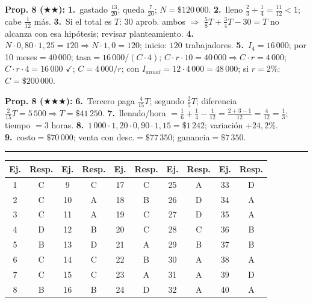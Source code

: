 \documentclass[11pt, letterpaper]{article}
\newcommand{\subbloque}[1]{%
  \vspace{14pt}
  \noindent{\large\bfseries\color{zenitnavy} #1}\par
  \vspace{4pt}\hrule height 1pt\vspace{8pt}}
\begin{document}
\textbf{Prop. 8 ($\bigstar\bigstar$):} \textbf{1.}~gastado $\tfrac{13}{20}$; queda $\tfrac{7}{20}$; $N=\$120\,000$. \quad \textbf{2.}~lleno $\tfrac{2}{3}+\tfrac{1}{4}=\tfrac{11}{12}<1$; cabe $\tfrac{1}{12}$ m\'as. \quad \textbf{3.}~Si el total es $T$: $30$ aprob. ambos $\Rightarrow$ $\tfrac{5}{8}T+\tfrac{3}{4}T-30=T$ no alcanza con esa hip\'otesis; revisar planteamiento. \quad \textbf{4.}~$N\cdot0{,}80\cdot1{,}25=120\Rightarrow N\cdot1{,}0=120$; inicio: $120$ trabajadores. \quad \textbf{5.}~$I_4=16\,000$; por 10 meses$=40\,000$; tasa$=16\,000/(C\cdot4)$; $C\cdot r\cdot10=40\,000\Rightarrow C\cdot r=4\,000$; $C\cdot r\cdot4=16\,000$ $\checkmark$; $C=4\,000/r$; con $I_{anual}=12\cdot4\,000=48\,000$; si $r=2\%$: $C=\$200\,000$.

\textbf{Prop. 8 ($\bigstar\bigstar\bigstar$):} \textbf{6.}~Tercero paga $\tfrac{4}{15}T$; segundo $\tfrac{2}{5}T$; diferencia $\tfrac{2}{15}T=5\,500\Rightarrow T=\$41\,250$. \quad \textbf{7.}~llenado/hora $=\tfrac{1}{6}+\tfrac{1}{4}-\tfrac{1}{12}=\tfrac{2+3-1}{12}=\tfrac{4}{12}=\tfrac{1}{3}$; tiempo $=3$ horas. \quad \textbf{8.}~$1\,000\cdot1{,}20\cdot0{,}90\cdot1{,}15=\$1\,242$; variaci\'on $+24{,}2\%$. \quad \textbf{9.}~costo$=\$70\,000$; venta con desc.$=\$77\,350$; ganancia$=\$7\,350$.

\subbloque{Ejercicios tipo PAES}

\begin{center}
\renewcommand{\arraystretch}{1.3}
\begin{tabular}{c|c||c|c||c|c||c|c||c|c}
\toprule
\textbf{Ej.} & \textbf{Resp.} & \textbf{Ej.} & \textbf{Resp.} & \textbf{Ej.} & \textbf{Resp.} & \textbf{Ej.} & \textbf{Resp.} & \textbf{Ej.} & \textbf{Resp.}\\
\midrule
1  & C & 9  & C & 17 & C & 25 & A & 33 & D\\
2  & C & 10 & A & 18 & B & 26 & D & 34 & A\\
3  & C & 11 & A & 19 & C & 27 & D & 35 & A\\
4  & D & 12 & B & 20 & C & 28 & C & 36 & B\\
5  & B & 13 & D & 21 & A & 29 & B & 37 & B\\
6  & C & 14 & C & 22 & B & 30 & A & 38 & A\\
7  & C & 15 & C & 23 & A & 31 & A & 39 & D\\
8  & B & 16 & B & 24 & D & 32 & A & 40 & A\\
\bottomrule
\end{tabular}
\end{center}
\end{document}
